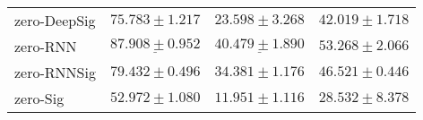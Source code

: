 \begin{tabular}{llll}
zero-DeepSig   &                           $ 75.783 \pm 1.217 $ &                           $ 23.598 \pm 3.268 $ &                           $ 42.019 \pm 1.718 $ \\
zero-RNN       &            $  \underline{ 87.908 \pm 0.952 } $ &            $  \underline{ 40.479 \pm 1.890 } $ &                           $ 53.268 \pm 2.066 $ \\
zero-RNNSig    &                           $ 79.432 \pm 0.496 $ &                           $ 34.381 \pm 1.176 $ &                           $ 46.521 \pm 0.446 $ \\
zero-Sig       &                           $ 52.972 \pm 1.080 $ &                           $ 11.951 \pm 1.116 $ &                           $ 28.532 \pm 8.378 $ \\
\bottomrule
\end{tabular}

